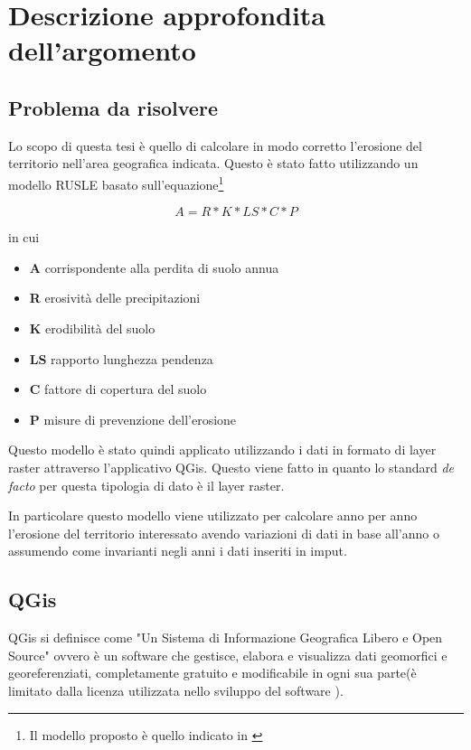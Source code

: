 
\chapter{Descrizione approfondita dell'argomento}
\label{cap:descrizione}
\section{Problema da risolvere} Lo scopo di questa tesi è quello di calcolare in
modo corretto l'erosione del territorio nell'area geografica indicata. Questo è
stato fatto utilizzando un modello RUSLE basato sull'equazione\footnote{Il
modello proposto è quello indicato in \cite[p.~37]{tesi:ambientale}}

\begin{equation}
A = R * K * LS * C * P
\end{equation}

in cui
\begin{itemize}
\item \textbf{A} corrispondente alla perdita di suolo annua
\item \textbf{R} erosività delle precipitazioni
\item \textbf{K} erodibilità del suolo
\item \textbf{LS} rapporto lunghezza pendenza
\item \textbf{C} fattore di copertura del suolo
\item \textbf{P} misure di prevenzione dell'erosione
\end{itemize}

Questo modello è stato quindi applicato utilizzando i dati in formato di layer raster attraverso l'applicativo QGis.
Questo viene fatto in quanto lo standard \textit{de facto} per questa tipologia di dato è il layer raster.


In particolare questo modello viene utilizzato per calcolare anno per anno l'erosione del territorio interessato avendo variazioni di dati in base all'anno o assumendo come invarianti negli anni i dati inseriti in imput.

\section{QGis}

QGis si definisce come "Un Sistema di Informazione Geografica Libero e Open Source"\cite{site:qgis} ovvero è un software che gestisce, elabora e visualizza dati geomorfici e georeferenziati, completamente gratuito e modificabile in ogni sua parte(è limitato dalla licenza utilizzata nello sviluppo del software \cite{site:cc3}).

